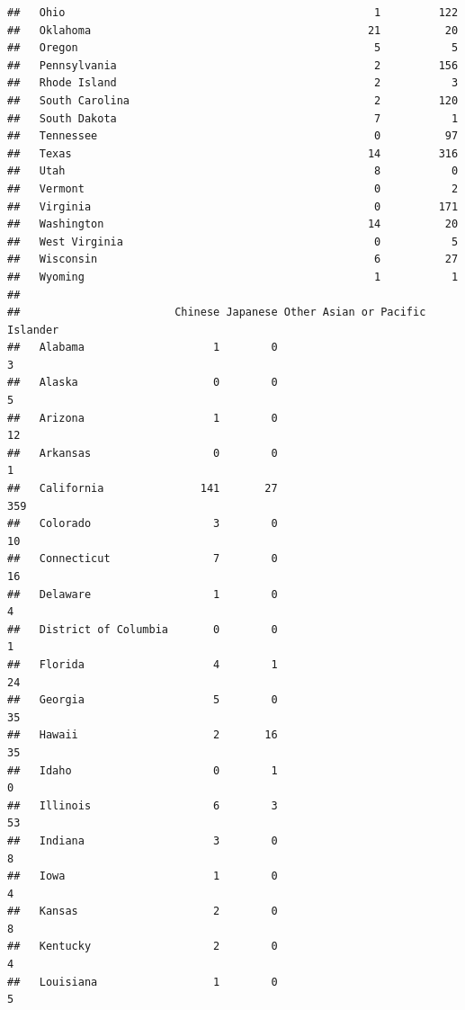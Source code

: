 \documentclass[]{book}
\theoremstyle{definition}
\theoremstyle{definition}
\theoremstyle{definition}
\theoremstyle{remark}
\begin{document}
\begin{verbatim}
##   Ohio                                                1         122
##   Oklahoma                                           21          20
##   Oregon                                              5           5
##   Pennsylvania                                        2         156
##   Rhode Island                                        2           3
##   South Carolina                                      2         120
##   South Dakota                                        7           1
##   Tennessee                                           0          97
##   Texas                                              14         316
##   Utah                                                8           0
##   Vermont                                             0           2
##   Virginia                                            0         171
##   Washington                                         14          20
##   West Virginia                                       0           5
##   Wisconsin                                           6          27
##   Wyoming                                             1           1
##                       
##                        Chinese Japanese Other Asian or Pacific Islander
##   Alabama                    1        0                               3
##   Alaska                     0        0                               5
##   Arizona                    1        0                              12
##   Arkansas                   0        0                               1
##   California               141       27                             359
##   Colorado                   3        0                              10
##   Connecticut                7        0                              16
##   Delaware                   1        0                               4
##   District of Columbia       0        0                               1
##   Florida                    4        1                              24
##   Georgia                    5        0                              35
##   Hawaii                     2       16                              35
##   Idaho                      0        1                               0
##   Illinois                   6        3                              53
##   Indiana                    3        0                               8
##   Iowa                       1        0                               4
##   Kansas                     2        0                               8
##   Kentucky                   2        0                               4
##   Louisiana                  1        0                               5

\end{verbatim}
\end{document}
